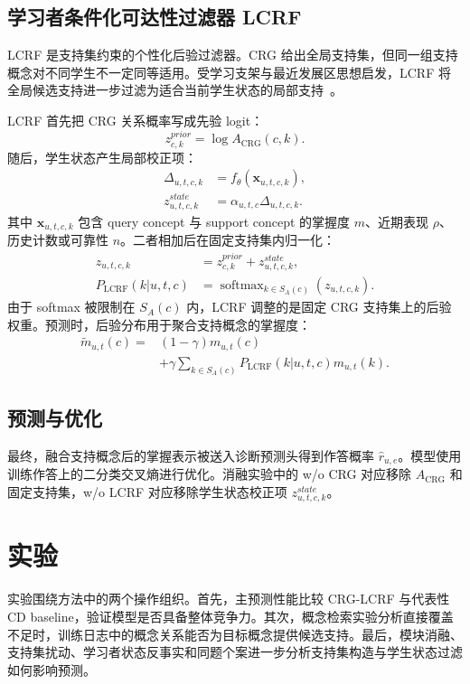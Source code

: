 \documentclass[conference]{IEEEtran}
\begin{document}
\subsection{学习者条件化可达性过滤器 LCRF}
LCRF 是支持集约束的个性化后验过滤器。CRG 给出全局支持集，但同一组支持概念对不同学生不一定同等适用。受学习支架与最近发展区思想启发，LCRF 将全局候选支持进一步过滤为适合当前学生状态的局部支持~\cite{vygotsky1978mind,wood1976tutoring}。

LCRF 首先把 CRG 关系概率写成先验 logit：
\[
z^{prior}_{c,k}=\log A_{\mathrm{CRG}}(c,k).
\]
随后，学生状态产生局部校正项：
\[
\begin{aligned}
\Delta_{u,t,c,k}&=f_{\theta}(\mathbf{x}_{u,t,c,k}),\\
z^{state}_{u,t,c,k}&=\alpha_{u,t,c}\Delta_{u,t,c,k}.
\end{aligned}
\]
其中 \(\mathbf{x}_{u,t,c,k}\) 包含 query concept 与 support concept 的掌握度 \(m\)、近期表现 \(\rho\)、历史计数或可靠性 \(n\)。二者相加后在固定支持集内归一化：
\[
\begin{aligned}
z_{u,t,c,k}
&=z^{prior}_{c,k}+z^{state}_{u,t,c,k},\\
P_{\mathrm{LCRF}}(k|u,t,c)
&=\operatorname{softmax}_{k\in S_A(c)}(z_{u,t,c,k}).
\end{aligned}
\]
由于 softmax 被限制在 \(S_A(c)\) 内，LCRF 调整的是固定 CRG 支持集上的后验权重。预测时，后验分布用于聚合支持概念的掌握度：
\[
\begin{aligned}
\tilde{m}_{u,t}(c)=&
(1-\gamma)m_{u,t}(c)\\
&+\gamma
\sum_{k\in S_A(c)}
P_{\mathrm{LCRF}}(k|u,t,c)m_{u,t}(k).
\end{aligned}
\]

\subsection{预测与优化}
最终，融合支持概念后的掌握表示被送入诊断预测头得到作答概率 \(\hat r_{u,e}\)。模型使用训练作答上的二分类交叉熵进行优化。消融实验中的 w/o CRG 对应移除 \(A_{\mathrm{CRG}}\) 和固定支持集，w/o LCRF 对应移除学生状态校正项 \(z^{state}_{u,t,c,k}\)。

\section{实验}
实验围绕方法中的两个操作组织。首先，主预测性能比较 CRG-LCRF 与代表性 CD baseline，验证模型是否具备整体竞争力。其次，概念检索实验分析直接覆盖不足时，训练日志中的概念关系能否为目标概念提供候选支持。最后，模块消融、支持集扰动、学习者状态反事实和同题个案进一步分析支持集构造与学生状态过滤如何影响预测。
\end{document}
